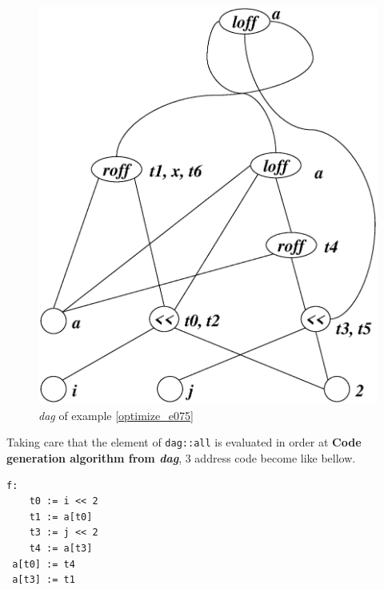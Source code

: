 \begin{Example}
\begin{figure}[htbp]
\begin{center}
\begin{latexonly}
\includegraphics[width=1.0\linewidth,height=1.4\linewidth]{opt031.eps}
\end{latexonly}
\caption{{\em dag} of example \ref{optimize_e075}}
\label{optimize_e076}
\end{center}
\end{figure}
Taking care that the element of {\tt{dag::all}}
is evaluated in order at
{\bf Code generation algorithm from {\em dag}},
3 address code become like bellow.
\begin{verbatim}
f:
    t0 := i << 2
    t1 := a[t0]
    t3 := j << 2
    t4 := a[t3]
 a[t0] := t4
 a[t3] := t1
\end{verbatim}
\end{Example}


